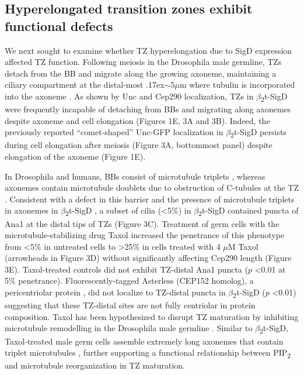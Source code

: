 \documentclass[12pt, twoside, letterpaper]{article}
\newcommand{\PIP}{PIP\textsubscript{2}}
\newcommand{\sigd}{$\beta$\textsubscript{2}t-SigD}
\begin{document}
\begin{doublespacing}
\begin{linenumbers}
    \subsection*{Hyperelongated transition zones exhibit functional defects}
    We next sought to examine whether TZ hyperelongation due to SigD expression
    affected TZ function.
    Following meiosis in the Drosophila male germline, TZs detach from
    the BB and migrate along the growing axoneme, maintaining a ciliary compartment
    at the distal-most {\raise.17ex\hbox{$\scriptstyle\sim$}}5$\mu$m where tubulin
    is incorporated into the axoneme
    \citep{basiri2014migrating, fabian2012drosophila}.
    As shown by Unc and Cep290 localization,
    TZs in \sigd{} were frequently incapable of detaching from
    BBs and migrating along axonemes despite
    axoneme and cell elongation
    (Figures 1E, 3A and 3B).
    Indeed, the previously reported ``comet-shaped'' Unc-GFP localization in \sigd{}
    \citep{wei2008depletion}
    persists during cell elongation after meiosis
    (Figure 3A, bottommost panel)
    despite elongation of the axoneme (Figure 1E).

    In Drosophila and humans, BBs consist of microtubule triplets
    \citep{jana2016drosophila, lattao2017centrioles},
    whereas axonemes contain microtubule doublets due to obstruction of
    C-tubules at the TZ \citep{gottardo2013cilium}.
    Consistent with a defect in this barrier and the presence of
    microtubule triplets in axonemes in \sigd{} \citep{wei2008depletion},
    a subset of cilia (<5\%) in \sigd{}
    contained puncta of Ana1 at the distal
    tips of TZs (Figure 3C).
    Treatment of germ cells with the microtubule-stabilizing drug
    Taxol increased the penetrance of this phenotype from <5\% in untreated cells
    to \textgreater25\% in cells treated with 4 $\mu$M Taxol (arrowheads in Figure 3D)
    without significantly affecting Cep290 length (Figure 3E).
    Taxol-treated controls did not exhibit TZ-distal Ana1 puncta ($p$ <0.01 at 5\% penetrance).
    Fluorescently-tagged Asterless (CEP152 homolog), a pericentriolar protein
    \citep{blachon2008drosophila, dzhindzhev2010asterless},
    did not localize to TZ-distal puncta in \sigd{} ($p$ <0.01)
    suggesting that these TZ-distal
    sites are not fully centriolar in protein composition.
    Taxol has been hypothesized to disrupt TZ maturation
    by inhibiting microtubule remodelling in the Drosophila male germline \citep{riparbelli2013unique}.
    Similar to \sigd{},
    Taxol-treated male germ cells assemble extremely long axonemes
    that contain triplet microtubules
    \citep{riparbelli2013unique}, further supporting a functional relationship between
    \PIP{} and microtubule reorganization in TZ maturation.


\end{linenumbers}
\end{doublespacing}
\end{document}
